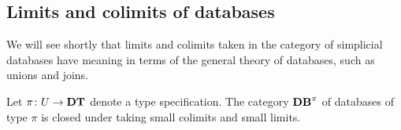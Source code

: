 \documentclass{amsart}
\begin{document}
\subsection{Limits and colimits of databases}

We will see shortly that limits and colimits taken in the category of simplicial databases have meaning in terms of the general theory of databases, such as unions and joins.  

\begin{theorem}\label{thm:colimits and limits}

Let $\pi\colon U\rightarrow{\bf DT}$ denote a type specification.  The category ${\bf DB}^\pi$ of databases of type $\pi$ is closed under taking small colimits and small limits.

\end{theorem}
\end{document}
